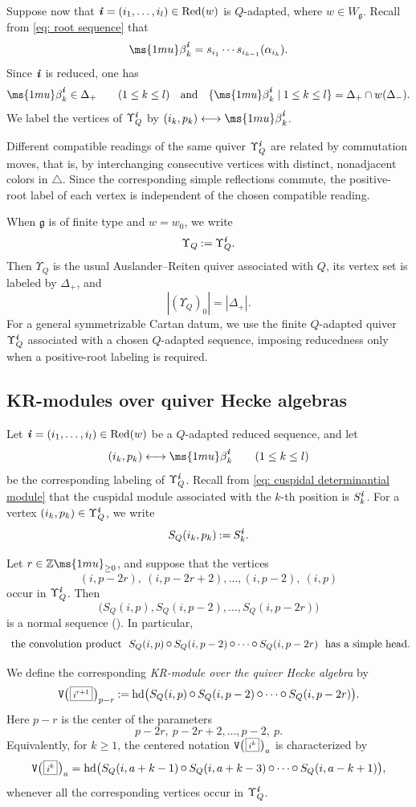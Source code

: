 \documentclass[12pt, leqno]{amsart}
\numberwithin{equation}{section}
\theoremstyle{plain}
\theoremstyle{definition}
\newcommand{\Vkm}[1]{%
  \ttV\bigl(\hspace{0.2ex}\scalebox{.8}{\(\boxed{#1}\)}\hspace{0.2ex}\bigr)%
}
\newcommand{\head}{{\operatorname{hd}}}
\newcommand{\seteq}{\mathbin{:=}}
\newcommand{\conv}{\mathop{\mathbin{\mbox{\large $\circ$}}}}
\newcommand{\g}{\mathfrak{g}}
\newcommand{\Z}{\mathbb{Z}\ms{1mu}}
\newcommand{\be}{{\ms{1mu}\beta}}
\newcommand{\Dynkin}{\triangle}
\newcommand{\ii}{ \textbf{\textit{i}}}
\newcommand{\ttV}{\mathtt{V}}
\newcommand{\qtq}[1][{and}]{\quad\text{{#1}}\quad}
\newcommand{\Red}{\mathrm{Red}}
\begin{document}
 

Suppose now that $\ii=(i_1,\ldots,i_l)\in\Red(w)$ is
\(Q\)-adapted, where \(w\in W_\g\). Recall from \eqref{eq: root sequence} that
\[ 
\be_k^\ii = s_{i_1}\cdots s_{i_{k-1}}(\alpha_{i_k}).
\]
Since \(\ii\) is reduced, one has
\[
\be_k^\ii\in\Delta_+ \qquad(1\leq k\leq l) 
\qtq 
\{\be_k^\ii\mid1\leq k\leq l\}
=
\Delta_+\cap w(\Delta_-).
\]
We label the vertices of \(\Upsilon_Q^\ii\) by
$(i_k,p_k)
\longleftrightarrow
\be_k^\ii$.


Different compatible readings of the same quiver
\(\Upsilon_Q^\ii\) are related by commutation moves, that is, by
interchanging consecutive vertices with distinct, nonadjacent colors in $\Dynkin$. Since the
corresponding simple reflections commute, the positive-root
label of each vertex is independent of the chosen compatible
reading.

When \(\g\) is of finite type and \(w=w_0\), we write
\[
\Upsilon_Q\seteq\Upsilon_Q^\ii.
\]
Then \(\Upsilon_Q\) is the usual Auslander--Reiten quiver associated
with \(Q\), its vertex set is labeled by \(\Delta_+\), and
\[
|(\Upsilon_Q)_0|=|\Delta_+|.
\]
For a general symmetrizable Cartan datum, we use the finite
\(Q\)-adapted quiver \(\Upsilon_Q^\ii\) associated with a chosen
\(Q\)-adapted sequence, imposing reducedness only when a
positive-root labeling is required.


\subsection{KR-modules over quiver Hecke algebras}
\label{subsec: KR modules}

Let $\ii=(i_1,\ldots,i_l)\in\Red(w)$
be a \(Q\)-adapted reduced sequence, and let
\[
(i_k,p_k)\longleftrightarrow\be_k^\ii
\qquad(1\leq k\leq l)
\]
be the corresponding labeling of \(\Upsilon_Q^\ii\).
Recall from \eqref{eq: cuspidal determinantial module} that the
cuspidal module associated with the \(k\)-th position is \(S_k^\ii\).
For a vertex \((i_k,p_k)\in\Upsilon_Q^\ii\), we write
\[
S_Q(i_k,p_k)\seteq S_k^\ii.
\]

Let \(r\in\Z_{\geq0}\), and suppose that the vertices
\[
(i,p-2r),\ (i,p-2r+2),\ldots,(i,p-2),\ (i,p)
\]
occur in \(\Upsilon_Q^\ii\). Then
\[
\bigl(
S_Q(i,p),S_Q(i,p-2),\ldots,S_Q(i,p-2r)
\bigr)
\]
is a normal sequence (\cite[Proposition 4.3]{KKOP23F}).  In particular, 
\[
\text{ the convolution product } \  S_Q(i,p)\conv S_Q(i,p-2)\conv\cdots\conv S_Q(i,p-2r) \  
\text{ has a simple head.}
\]


We define the corresponding \emph{KR-module over the quiver Hecke
algebra} by
\begin{align} \label{eq: KR-module over quiver Hecke}
\Vkm{i^{r+1}}_{p-r}
\seteq
\head\bigl(
S_Q(i,p)\conv S_Q(i,p-2)\conv\cdots
\conv S_Q(i,p-2r)
\bigr).
\end{align}
Here \(p-r\) is the center of the parameters
\[
p-2r,\ p-2r+2,\ldots,p-2,\ p.
\]
Equivalently, for \(k\geq1\), the centered notation
$\Vkm{i^{k}}_{a}$ is characterized by
\[
\Vkm{i^{k}}_{a} = \head\bigl( S_Q(i,a+k-1)\conv S_Q(i,a+k-3)\conv\cdots\conv S_Q(i,a-k+1) \bigr),
\]
whenever all the corresponding vertices occur in
\(\Upsilon_Q^\ii\).
\end{document}
